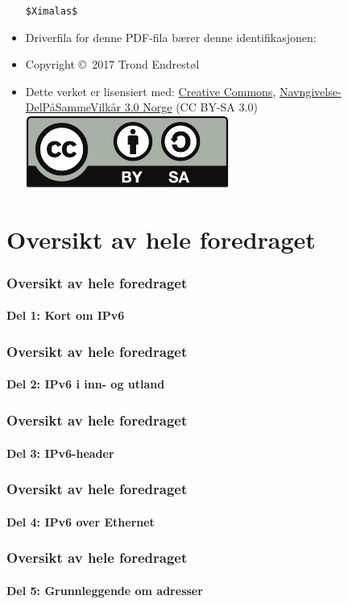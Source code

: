 \begin{frame}[allowframebreaks]
\begin{itemize}
    \texttt{\$${}$Ximalas${}$\$}
  \item Driverfila for denne PDF-fila bærer denne identifikasjonen:\\
    \svndriverfil
  \item Copyright \copyright\ 2017 Trond Endrestøl
  \item Dette verket er lisensiert med:
    \href{http://creativecommons.org/}{Creative Commons},
    \href{http://creativecommons.org/licenses/by-sa/3.0/no/}{Navngivelse-DelPåSammeVilkår
      3.0 Norge} (CC BY-SA
    3.0)\hfill\includegraphics[scale=.25]{by-sa.pdf}
  \end{itemize}
\end{frame}

\section*{Oversikt av hele foredraget}
\begin{frame}%
  \frametitle{Oversikt av hele foredraget}
  \framesubtitle{Del 1: Kort om IPv6}
  \tableofcontents[part=1]%
\end{frame}

\begin{frame}%
  \frametitle{Oversikt av hele foredraget}
  \framesubtitle{Del 2: IPv6 i inn- og utland}
  \tableofcontents[part=2]%
\end{frame}

\begin{frame}%
  \frametitle{Oversikt av hele foredraget}
  \framesubtitle{Del 3: IPv6-header}
  \tableofcontents[part=3]%
\end{frame}

\begin{frame}%
  \frametitle{Oversikt av hele foredraget}
  \framesubtitle{Del 4: IPv6 over Ethernet}
  \tableofcontents[part=4]%
\end{frame}

\begin{frame}%
  \frametitle{Oversikt av hele foredraget}
  \framesubtitle{Del 5: Grunnleggende om adresser}
  \tableofcontents[part=5]%
\end{frame}

